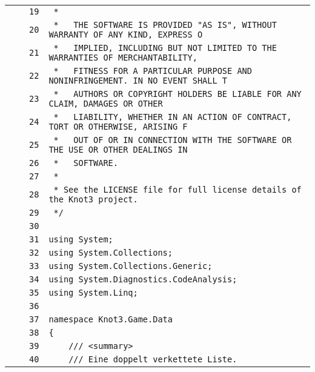 \documentclass[a4paper,10pt]{article}
\begin{document}
\begin{longtable}[l]{lrrl}
\cellcolor{gray} &  & \verb~19~ & \verb~ *~\\
\cellcolor{gray} &  & \verb~20~ & \verb~ *   THE SOFTWARE IS PROVIDED "AS IS", WITHOUT WARRANTY OF ANY KIND, EXPRESS O~\\
\cellcolor{gray} &  & \verb~21~ & \verb~ *   IMPLIED, INCLUDING BUT NOT LIMITED TO THE WARRANTIES OF MERCHANTABILITY,~\\
\cellcolor{gray} &  & \verb~22~ & \verb~ *   FITNESS FOR A PARTICULAR PURPOSE AND NONINFRINGEMENT. IN NO EVENT SHALL T~\\
\cellcolor{gray} &  & \verb~23~ & \verb~ *   AUTHORS OR COPYRIGHT HOLDERS BE LIABLE FOR ANY CLAIM, DAMAGES OR OTHER~\\
\cellcolor{gray} &  & \verb~24~ & \verb~ *   LIABILITY, WHETHER IN AN ACTION OF CONTRACT, TORT OR OTHERWISE, ARISING F~\\
\cellcolor{gray} &  & \verb~25~ & \verb~ *   OUT OF OR IN CONNECTION WITH THE SOFTWARE OR THE USE OR OTHER DEALINGS IN~\\
\cellcolor{gray} &  & \verb~26~ & \verb~ *   SOFTWARE.~\\
\cellcolor{gray} &  & \verb~27~ & \verb~ *~\\
\cellcolor{gray} &  & \verb~28~ & \verb~ * See the LICENSE file for full license details of the Knot3 project.~\\
\cellcolor{gray} &  & \verb~29~ & \verb~ */~\\
\cellcolor{gray} &  & \verb~30~ & \verb~~\\
\cellcolor{gray} &  & \verb~31~ & \verb~using System;~\\
\cellcolor{gray} &  & \verb~32~ & \verb~using System.Collections;~\\
\cellcolor{gray} &  & \verb~33~ & \verb~using System.Collections.Generic;~\\
\cellcolor{gray} &  & \verb~34~ & \verb~using System.Diagnostics.CodeAnalysis;~\\
\cellcolor{gray} &  & \verb~35~ & \verb~using System.Linq;~\\
\cellcolor{gray} &  & \verb~36~ & \verb~~\\
\cellcolor{gray} &  & \verb~37~ & \verb~namespace Knot3.Game.Data~\\
\cellcolor{gray} &  & \verb~38~ & \verb~{~\\
\cellcolor{gray} &  & \verb~39~ & \verb~    /// <summary>~\\
\cellcolor{gray} &  & \verb~40~ & \verb~    /// Eine doppelt verkettete Liste.~\\

\end{longtable}
\end{document}
